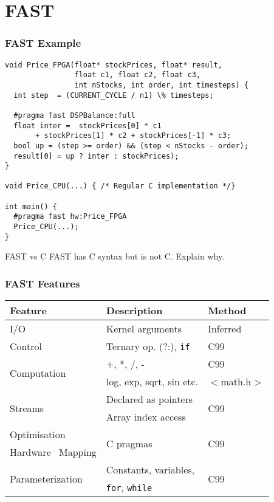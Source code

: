 \section{FAST}
\begin{frame}[fragile]
  \frametitle{FAST Example}

\begin{lstlisting}
void Price_FPGA(float* stockPrices, float* result,
                float c1, float c2, float c3,
                int nStocks, int order, int timesteps) {
  int step  = (CURRENT_CYCLE / n1) \% timesteps;

  #pragma fast DSPBalance:full
  float inter =  stockPrices[0] * c1
       + stockPrices[1] * c2 + stockPrices[-1] * c3;
  bool up = (step >= order) && (step < nStocks - order);
  result[0] = up ? inter : stockPrices);
}

void Price_CPU(...) { /* Regular C implementation */}

int main() {
  #pragma fast hw:Price_FPGA
  Price_CPU(...);
}
\end{lstlisting}

\end{frame}

\begin{frame}{FAST vs C}
  FAST has C syntax but is not C. Explain why.
\end{frame}

\begin{frame}
  \frametitle{FAST Features}

\begin{table}[!h]
  \centering
\renewcommand{\arraystretch}{1.4}
\begin{tabular}{l|l|l}
\hline
\bf{Feature}                        & \bf{Description}              & \bf{Method}          \\
\hline\hline
  I/O                               & Kernel arguments              & Inferred             \\
\hline
  Control                           & Ternary op. (?:), \texttt{if} & C99                  \\
\hline
\multirow{2}{*}{Computation}        & +, *, /, -                    & C99                  \\
                                    & log, exp, sqrt, sin etc.      & $<$math.h$>$         \\
\hline
  \multirow{2}{*}{Streams}          & Declared as pointers          & \multirow{2}{*}{C99} \\
                                    & Array index access     &                      \\
\hline
  Optimisation                      & \multirow{2}{*}{C pragmas}    & \multirow{2}{*}{C99} \\
  Hardware \  Mapping               &                               &                      \\
\hline
  \multirow{2}{*}{Parameterization} & Constants, variables,         & \multirow{2}{*}{C99} \\
                                    & \texttt{for}, \texttt{while}  &                      \\
\end{tabular}
\end{table}
\end{frame}